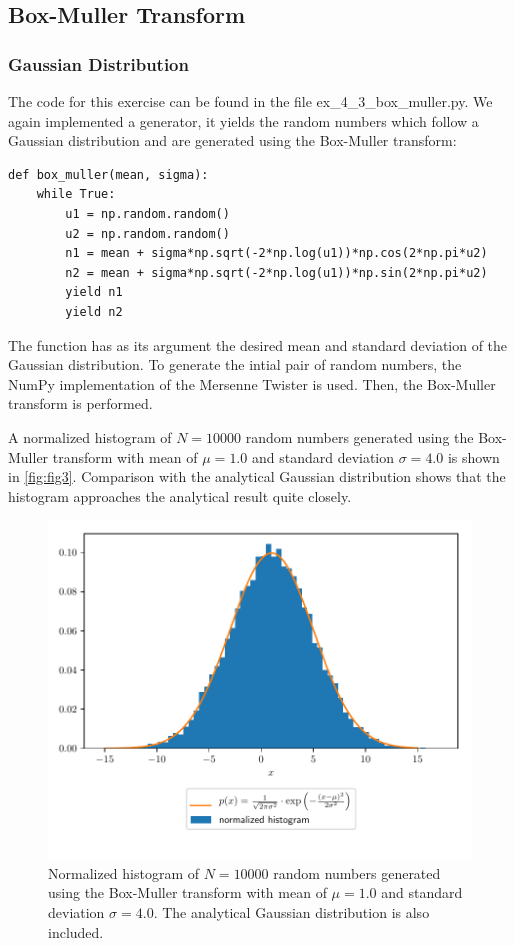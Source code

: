 \documentclass[a4paper,10pt,bibtotoc]{scrartcl}
\begin{document}
\subsection{Box-Muller Transform}
\subsubsection{Gaussian Distribution}
The code for this exercise can be found in the file ex\_4\_3\_box\_muller.py. 
We again implemented a generator, it yields the random numbers which follow a Gaussian distribution and are generated using the Box-Muller transform:
\begin{lstlisting}
def box_muller(mean, sigma):
    while True:
        u1 = np.random.random()
        u2 = np.random.random()
        n1 = mean + sigma*np.sqrt(-2*np.log(u1))*np.cos(2*np.pi*u2)
        n2 = mean + sigma*np.sqrt(-2*np.log(u1))*np.sin(2*np.pi*u2)
        yield n1
        yield n2
\end{lstlisting}
The function has as its argument the desired mean and standard deviation of the Gaussian distribution. 
To generate the intial pair of random numbers, the NumPy implementation of the Mersenne Twister is used.
Then, the Box-Muller transform is performed.

A normalized histogram of $N=10000$ random numbers generated using the Box-Muller transform with mean of $\mu=1.0$ and standard deviation $\sigma = 4.0$ is shown in \autoref{fig:fig3}. 
Comparison with the analytical Gaussian distribution shows that the histogram approaches the analytical result quite closely.
\begin{figure}[H]
	\centering
	\includegraphics[width=\linewidth]{gaussian.pdf}
	\caption{Normalized histogram of $N=10000$ random numbers generated using the Box-Muller transform with mean of $\mu=1.0$ and standard deviation $\sigma = 4.0$. The analytical Gaussian distribution is also included.}
	\label{fig:fig3}
\end{figure}
\end{document}
